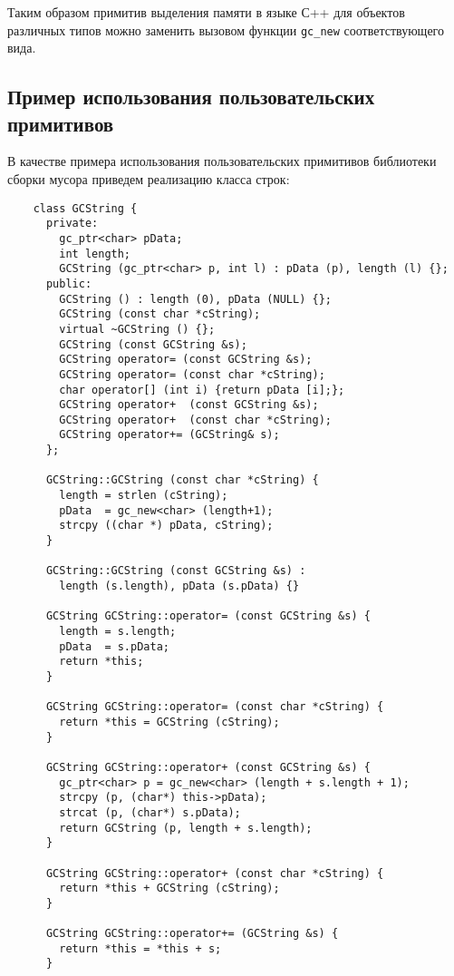 Таким образом примитив выделения памяти в языке С++ для объектов различных типов можно заменить вызовом функции \lstinline{gc_new} 
соответствующего вида.

\subsection{Пример использования пользовательских примитивов}

В качестве примера использования пользовательских примитивов библиотеки сборки мусора приведем 
реализацию класса строк:

\begin{lstlisting}
    class GCString {
      private:
        gc_ptr<char> pData; 	
        int length;	 
        GCString (gc_ptr<char> p, int l) : pData (p), length (l) {};     
      public:
        GCString () : length (0), pData (NULL) {};
        GCString (const char *cString);
        virtual ~GCString () {};
        GCString (const GCString &s);
        GCString operator= (const GCString &s);
        GCString operator= (const char *cString);
        char operator[] (int i) {return pData [i];};
        GCString operator+  (const GCString &s);
        GCString operator+  (const char *cString);
        GCString operator+= (GCString& s);
      };

      GCString::GCString (const char *cString) {
        length = strlen (cString);
        pData  = gc_new<char> (length+1);
        strcpy ((char *) pData, cString);
      }

      GCString::GCString (const GCString &s) : 
        length (s.length), pData (s.pData) {}

      GCString GCString::operator= (const GCString &s) {
        length = s.length;
        pData  = s.pData;
        return *this;
      }

      GCString GCString::operator= (const char *cString) {
        return *this = GCString (cString);
      }

      GCString GCString::operator+ (const GCString &s) {
        gc_ptr<char> p = gc_new<char> (length + s.length + 1);
        strcpy (p, (char*) this->pData);
        strcat (p, (char*) s.pData);
        return GCString (p, length + s.length);
      }

      GCString GCString::operator+ (const char *cString) {
        return *this + GCString (cString);
      }

      GCString GCString::operator+= (GCString &s) {
        return *this = *this + s;
      }
\end{lstlisting}
